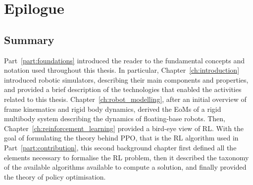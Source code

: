 


{}
{}

\acresetall
\chapter*{Epilogue}

\section*{Summary}

Part~\ref{part:foundations} introduced the reader to the fundamental concepts and notation used throughout this thesis.
In particular, Chapter~\ref{ch:introduction} introduced robotic simulators, describing their main components and properties, and provided a brief description of the technologies that enabled the activities related to this thesis.
Chapter~\ref{ch:robot_modelling}, after an initial overview of frame kinematics and rigid body dynamics, derived the \acp{EoM} of a rigid multibody system describing the dynamics of floating-base robots.
Then, Chapter~\ref{ch:reinforcement_learning} provided a bird-eye view of \ac{RL}.
With the goal of formulating the theory behind \ac{PPO}, that is the \ac{RL} algorithm used in Part~\ref{part:contribution}, this second background chapter first defined all the elements necessary to formalise the \ac{RL} problem, then it described the taxonomy of the available algorithms available to compute a solution, and finally provided the theory of policy optimisation.


